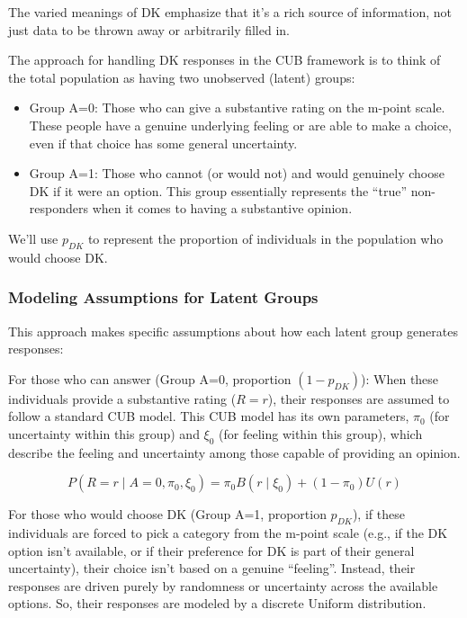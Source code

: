 \documentclass[
  letterpaper,
  DIV=11,
  numbers=noendperiod]{scrartcl}
\begin{document}
The varied meanings of DK emphasize that it's a rich source of
information, not just data to be thrown away or arbitrarily filled in.

The approach for handling DK responses in the CUB framework is to think
of the total population as having two unobserved (latent) groups:

\begin{itemize}
\item
  Group A=0: Those who can give a substantive rating on the m-point
  scale. These people have a genuine underlying feeling or are able to
  make a choice, even if that choice has some general uncertainty.
\item
  Group A=1: Those who cannot (or would not) and would genuinely choose
  DK if it were an option. This group essentially represents the
  ``true'' non-responders when it comes to having a substantive opinion.
\end{itemize}

We'll use \(p_{DK}\) to represent the proportion of individuals in the
population who would choose DK.

\hypertarget{modeling-assumptions-for-latent-groups}{%
\subsubsection{Modeling Assumptions for Latent
Groups}\label{modeling-assumptions-for-latent-groups}}

This approach makes specific assumptions about how each latent group
generates responses:

For those who can answer (Group A=0, proportion \((1-p_{DK})\)): When
these individuals provide a substantive rating (\(R=r\)), their
responses are assumed to follow a standard CUB model. This CUB model has
its own parameters, \(\pi_0\) (for uncertainty within this group) and
\(\xi_0\) (for feeling within this group), which describe the feeling
and uncertainty among those capable of providing an opinion.

\[
P(R = r \mid A = 0, \pi_0, \xi_0) = \pi_0B(r\mid\xi_0) + (1-\pi_0)U(r)
\]

For those who would choose DK (Group A=1, proportion \(p_{DK}\)), if
these individuals are forced to pick a category from the m-point scale
(e.g., if the DK option isn't available, or if their preference for DK
is part of their general uncertainty), their choice isn't based on a
genuine ``feeling''. Instead, their responses are driven purely by
randomness or uncertainty across the available options. So, their
responses are modeled by a discrete Uniform distribution.
\end{document}
